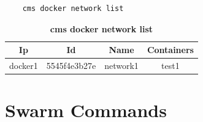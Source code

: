 \documentclass[9pt,twocolumn,twoside]{../../styles/osajnl}
\begin{document}
\begin{enumerate}
    \begin{verbatim}
    cms docker network list
    \end{verbatim} 
    \begin{table}[htbp]
     \caption{\bf cms docker network list }
     \begin{tabular}{cccc}
     \hline
      Ip & Id & Name & Containers\\
      \hline
      docker1 & 5545f4e3b27e & network1 & test1  \\
     \hline
     \end{tabular}
     \label{tab:tab4}
     \end{table}
\end{enumerate}


\section{Swarm Commands}
\end{document}
